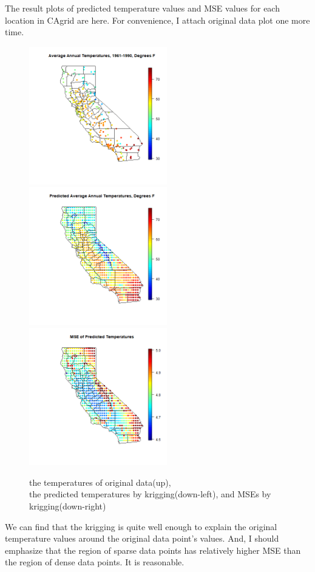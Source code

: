 \documentclass{article}
\begin{document}
\clearpage
The result plots of predicted temperature values and MSE values for each location in CAgrid are here.
For convenience, I attach original data plot one more time.

\begin{figure}[!h]
    \includegraphics[height=6cm]{prob2_CAtemp_avgtemp.png} \\
    \includegraphics[height=6cm]{prob2_CAgrid_predicted_mean.png}
    \includegraphics[height=6cm]{prob2_CAgrid_predicted_MSE.png}
    \caption{the temperatures of original data(up), 
    \\ the predicted temperatures by krigging(down-left), and MSEs by krigging(down-right)}
\end{figure}

We can find that the krigging is quite well enough to explain the original temperature values
around the original data point's values. 
And, I should emphasize that the region of sparse data points has relatively higher MSE
than the region of dense data points. It is reasonable.
\end{document}
